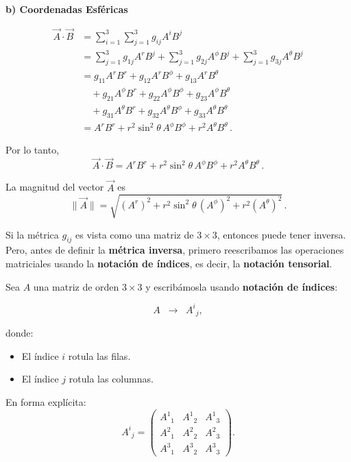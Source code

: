 \documentclass[../apunte_mecanica_clasica.tex]{subfiles}%
\begin{document}
\begin{apuntebloque}{}

\textbf{b) Coordenadas Esféricas}

\begin{align*}
    \vec{A} \cdot \vec{B} 
        &= \sum_{i=1}^3 \sum_{j=1}^3 g_{ij} A^i B^j \\[4pt]
        &= \sum_{j=1}^3 g_{1j} A^r B^j 
         + \sum_{j=1}^3 g_{2j} A^\phi B^j
         + \sum_{j=1}^3 g_{3j} A^\theta B^j \\[4pt]
        &= g_{11}A^r B^r + g_{12}A^r B^\phi + g_{13}A^r B^\theta \\
        &\quad + g_{21}A^\phi B^r + g_{22}A^\phi B^\phi + g_{23}A^\phi B^\theta \\
        &\quad + g_{31}A^\theta B^r + g_{32}A^\theta B^\phi + g_{33}A^\theta B^\theta \\[4pt]
        &= A^r B^r + r^2\sin^2\theta \, A^\phi B^\phi + r^2 A^\theta B^\theta \,.
\end{align*}

Por lo tanto,
\begin{equation*}
    \vec{A} \cdot \vec{B} = A^r B^r + r^2\sin^2\theta \, A^\phi B^\phi + r^2 A^\theta B^\theta \,.
\end{equation*}

La magnitud del vector $\vec{A}$ es
\begin{equation*}
    \|\vec{A}\| = \sqrt{(A^r)^2 + r^2\sin^2\theta \,(A^\phi)^2 + r^2 (A^\theta)^2} \,.
\end{equation*}
\end{apuntebloque}

Si la métrica $g_{ij}$ es vista como una matriz de $3 \times 3$, 
entonces puede tener inversa. Pero, antes de definir la \textbf{métrica inversa}, primero reescribamos 
las operaciones matriciales usando la \textbf{notación de índices}, 
es decir, la \textbf{notación tensorial}.

Sea $A$ una matriz de orden $3 \times 3$ y escribámosla usando 
\textbf{notación de índices}:

\[
A \;\; \longrightarrow \;\; A^i{}_j,
\]

donde:
\begin{itemize}
    \item El índice $i$ rotula las filas.
    \item El índice $j$ rotula las columnas.
\end{itemize}

En forma explícita:
\begin{equation*}
A^i{}_j =
\begin{pmatrix}
    A^1{}_1 & A^1{}_2 & A^1{}_3 \\
    A^2{}_1 & A^2{}_2 & A^2{}_3 \\
    A^3{}_1 & A^3{}_2 & A^3{}_3
\end{pmatrix}.
\end{equation*}
\end{document}
